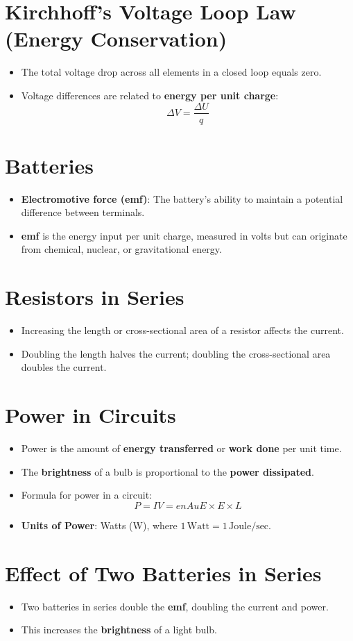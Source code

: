 \documentclass{article}
\begin{document}
\section*{Kirchhoff’s Voltage Loop Law (Energy Conservation)}
\begin{itemize}
    \item The total voltage drop across all elements in a closed loop equals zero.
    \item Voltage differences are related to \textbf{energy per unit charge}:
    \[
    \Delta V = \frac{\Delta U}{q}
    \]
\end{itemize}

\section*{Batteries}
\begin{itemize}
    \item \textbf{Electromotive force (emf)}: The battery's ability to maintain a potential difference between terminals.
    \item \textbf{emf} is the energy input per unit charge, measured in volts but can originate from chemical, nuclear, or gravitational energy.
\end{itemize}

\section*{Resistors in Series}
\begin{itemize}
    \item Increasing the length or cross-sectional area of a resistor affects the current.
    \item Doubling the length halves the current; doubling the cross-sectional area doubles the current.
\end{itemize}

\section*{Power in Circuits}
\begin{itemize}
    \item Power is the amount of \textbf{energy transferred} or \textbf{work done} per unit time.
    \item The \textbf{brightness} of a bulb is proportional to the \textbf{power dissipated}.
    \item Formula for power in a circuit:
    \[
    P = IV = enAuE \times E \times L
    \]
    \item \textbf{Units of Power}: Watts (W), where \( 1 \, \text{Watt} = 1 \, \text{Joule/sec} \).
\end{itemize}

\section*{Effect of Two Batteries in Series}
\begin{itemize}
    \item Two batteries in series double the \textbf{emf}, doubling the current and power.
    \item This increases the \textbf{brightness} of a light bulb.
\end{itemize}
\end{document}
